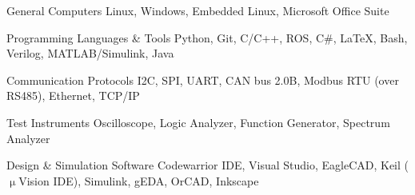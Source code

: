 

\begin{cvskills}

  \cvskill
    {General Computers} %
    {Linux, Windows, Embedded Linux, Microsoft Office Suite} %

  \cvskill
    {Programming Languages \& Tools} %
    {Python, Git, C/C++, ROS, C\#, LaTeX, Bash, Verilog, MATLAB/Simulink, Java} %

  \cvskill
    {Communication Protocols} %
    {I2C, SPI, UART, CAN bus 2.0B, Modbus RTU (over RS485), Ethernet, TCP/IP} %

  \cvskill
    {Test Instruments} %
    {Oscilloscope, Logic Analyzer, Function Generator, Spectrum Analyzer} %

  \cvskill
    {Design \& Simulation Software} %
    {Codewarrior IDE, Visual Studio, EagleCAD, Keil ($\upmu$Vision IDE), Simulink, gEDA, OrCAD, Inkscape} %

\end{cvskills}

